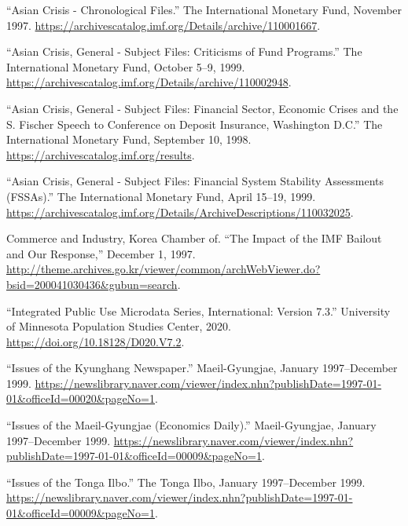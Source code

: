 \hypertarget{refs}{}
\begin{CSLReferences}{1}{0}
\leavevmode{}%
{``Asian {Crisis} - {Chronological Files}.''} {The International
Monetary Fund}, November 1997.
\url{https://archivescatalog.imf.org/Details/archive/110001667}.

\leavevmode{}%
{``Asian {Crisis}, {General} - {Subject} Files: Criticisms of {Fund
Programs}.''} {The International Monetary Fund}, October 5--9, 1999.
\url{https://archivescatalog.imf.org/Details/archive/110002948}.

\leavevmode{}%
{``Asian {Crisis}, {General} - {Subject} Files: Financial {Sector},
{Economic Crises} and the {S}. {Fischer} Speech to {Conference} on
{Deposit Insurance}, {Washington D}.{C}.''} {The International Monetary
Fund}, September 10, 1998.
\url{https://archivescatalog.imf.org/results}.

\leavevmode{}%
{``Asian {Crisis}, {General} - {Subject} Files: Financial {System
Stability Assessments} ({FSSAs}).''} {The International Monetary Fund},
April 15--19, 1999.
\url{https://archivescatalog.imf.org/Details/ArchiveDescriptions/110032025}.

\leavevmode{}%
Commerce and Industry, Korea Chamber of. {``The {Impact} of the {IMF
Bailout} and {Our Response},''} December 1, 1997.
\url{http://theme.archives.go.kr/viewer/common/archWebViewer.do?bsid=200041030436\&gubun=search}.

\leavevmode{}%
{``Integrated {Public Use Microdata Series}, {International}: Version
7.3.''} {University of Minnesota Population Studies Center}, 2020.
\url{https://doi.org/10.18128/D020.V7.2}.

\leavevmode{}%
{``Issues of the Kyunghang Newspaper.''} {Maeil-Gyungjae}, January
1997--December 1999.
\url{https://newslibrary.naver.com/viewer/index.nhn?publishDate=1997-01-01\&officeId=00020\&pageNo=1}.

\leavevmode{}%
{``Issues of the Maeil-Gyungjae (Economics Daily).''} {Maeil-Gyungjae},
January 1997--December 1999.
\url{https://newslibrary.naver.com/viewer/index.nhn?publishDate=1997-01-01\&officeId=00009\&pageNo=1}.

\leavevmode{}%
{``Issues of the Tonga Ilbo.''} {The Tonga Ilbo}, January 1997--December
1999.
\url{https://newslibrary.naver.com/viewer/index.nhn?publishDate=1997-01-01\&officeId=00009\&pageNo=1}.


\end{CSLReferences}
